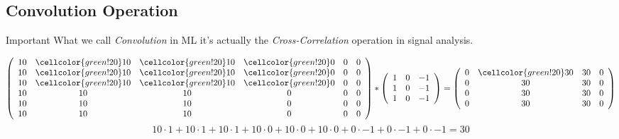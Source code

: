\subsection{Convolution Operation}
\begin{frame}{\insertsubsec}
    \begin{alertblock}{Important}
        What we call \textit{Convolution} in ML it's actually the \textit{Cross-Correlation} operation
        in signal analysis.
    \end{alertblock}
    
    \begin{align*}
        \left(
        \begin{array}{cccccc}
            10 & \cellcolor{green!20}10 & \cellcolor{green!20}10 & \cellcolor{green!20}0 & 0 & 0 \\
            10 & \cellcolor{green!20}10 & \cellcolor{green!20}10 & \cellcolor{green!20}0 & 0 & 0 \\
            10 & \cellcolor{green!20}10 & \cellcolor{green!20}10 & \cellcolor{green!20}0 & 0 & 0 \\
            10 & 10 & 10 & 0 & 0 & 0 \\
            10 & 10 & 10 & 0 & 0 & 0 \\
            10 & 10 & 10 & 0 & 0 & 0 \\
        \end{array}
        \right)
        *
        \left(
        \begin{array}{ccc}
            1 & 0 & -1 \\
            1 & 0 & -1 \\ 
            1 & 0 & -1 \\
        \end{array}
        \right)
        = 
        \left(
        \begin{array}{cccc}
            0 & \cellcolor{green!20}30 & 30 & 0 \\
            0 & 30 & 30 & 0 \\
            0 & 30 & 30 & 0 \\
            0 & 30 & 30 & 0 \\
        \end{array}
        \right)
    \end{align*}
    $$
        10 \cdot 1 + 10 \cdot 1 + 10 \cdot 1 +
        10 \cdot 0 + 10 \cdot 0 + 10 \cdot 0 +
        0 \cdot -1 + 0 \cdot -1 + 0 \cdot -1 = 30
    $$
\end{frame}

